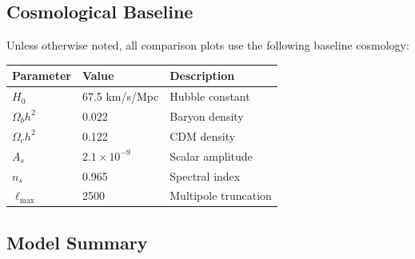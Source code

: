 \documentclass[11pt,a4paper]{article}
\begin{document}
\subsection{Cosmological Baseline}

Unless otherwise noted, all comparison plots use the following baseline cosmology:
\begin{center}
\begin{tabular}{lll}
\toprule
Parameter & Value & Description \\
\midrule
$H_0$ & 67.5 km/s/Mpc & Hubble constant \\
$\Omega_b h^2$ & 0.022 & Baryon density \\
$\Omega_c h^2$ & 0.122 & CDM density \\
$A_s$ & $2.1\times10^{-9}$ & Scalar amplitude \\
$n_s$ & 0.965 & Spectral index \\
$\ell_{\max}$ & 2500 & Multipole truncation \\
\bottomrule
\end{tabular}
\end{center}

\subsection{Model Summary}
\end{document}

